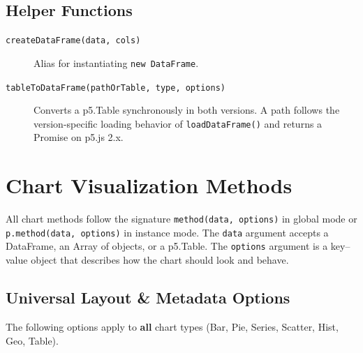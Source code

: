 \documentclass[10pt, a4paper]{article}
\begin{document}
\subsection{Helper Functions}
\begin{description}
    \item[\texttt{createDataFrame(data, cols)}] Alias for instantiating \texttt{new DataFrame}.
    \item[\texttt{tableToDataFrame(pathOrTable, type, options)}] Converts a p5.Table synchronously in both versions. A path follows the version-specific loading behavior of \texttt{loadDataFrame()} and returns a Promise on p5.js 2.x.
\end{description}

\section{Chart Visualization Methods}

All chart methods follow the signature \texttt{method(data, options)} in global mode or \texttt{p.method(data, options)} in instance mode. The \texttt{data} argument accepts a DataFrame, an Array of objects, or a p5.Table. The \texttt{options} argument is a key--value object that describes how the chart should look and behave.

\subsection{Universal Layout \& Metadata Options}
The following options apply to \textbf{all} chart types (Bar, Pie, Series, Scatter, Hist, Geo, Table).
\end{document}
